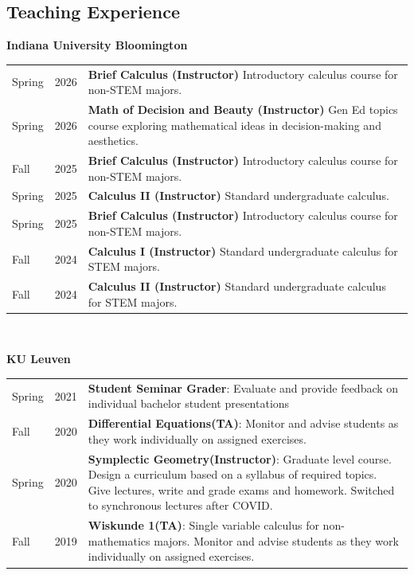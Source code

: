 \documentclass[margin,line,pifont,palatino,courier]{res}
\newenvironment{list1}{
  \begin{list}{\ding{113}}{%
      \setlength{\itemsep}{0in}
      \setlength{\parsep}{0in} \setlength{\parskip}{0in}
      \setlength{\topsep}{0in} \setlength{\partopsep}{0in}
      \setlength{\leftmargin}{0.17in}}}{\end{list}}
\begin{document}
\begin{resume}
\section{\sc Teaching Experience}
\begin{list1}
\item[] \textbf{Indiana University Bloomington}
\end{list1}
\begin{tabular}{@{}p{1.2in}p{0.5in}p{3in}}
Spring & 2026 & \textbf{Brief Calculus (Instructor)} 
Introductory calculus course for non-STEM majors. \\
Spring & 2026 & \textbf{Math of Decision and Beauty (Instructor)} 
Gen Ed topics course exploring mathematical ideas in decision-making and aesthetics. \\
Fall & 2025 & \textbf{Brief Calculus (Instructor)} 
Introductory calculus course for non-STEM majors. \\
Spring & 2025 & \textbf{Calculus II (Instructor)} 
Standard undergraduate calculus. \\
Spring & 2025 & \textbf{Brief Calculus (Instructor)} 
Introductory calculus course for non-STEM majors. \\
Fall & 2024 & \textbf{Calculus I (Instructor)} 
Standard undergraduate calculus for STEM majors. \\
Fall & 2024 & \textbf{Calculus II (Instructor)} 
Standard undergraduate calculus for STEM majors.\\
\end{tabular}\\
\begin{list1}
\item[] \textbf{KU Leuven}
\end{list1}\begin{tabular}{@{}p{1.2in}p{0.5in}p{3in}}
Spring & 2021  & \textbf{Student Seminar Grader}: Evaluate and provide feedback on individual bachelor student presentations \\
Fall & 2020 & \textbf{Differential Equations(TA)}: Monitor and advise students as they work individually on assigned exercises.\\
Spring & 2020 & \textbf{Symplectic Geometry(Instructor)}: Graduate level course. Design a curriculum based on a syllabus of required topics. Give lectures, write and grade exams and homework. Switched to synchronous lectures after COVID. \\
Fall & 2019 & \textbf{Wiskunde 1(TA)}: Single variable calculus for non-mathematics majors. Monitor and advise students as they work individually on assigned exercises.\\

\end{tabular}
\end{resume}
\end{document}
